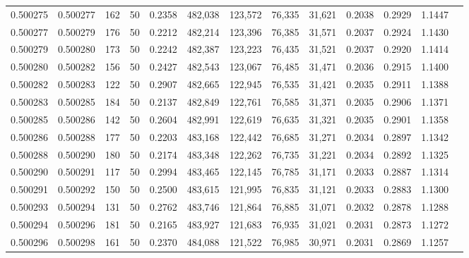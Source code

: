 \begin{tabular}{rrrrrrrrrrrrr}
0.500275 & 0.500277 & 162 &  50 &                                     0.2358 & 482,038 & 123,572 &  76,335 &  31,621 & 0.2038 & 0.2929 & 1.1447 \\
0.500277 & 0.500279 & 176 &  50 &                                     0.2212 & 482,214 & 123,396 &  76,385 &  31,571 & 0.2037 & 0.2924 & 1.1430 \\
0.500279 & 0.500280 & 173 &  50 &                                     0.2242 & 482,387 & 123,223 &  76,435 &  31,521 & 0.2037 & 0.2920 & 1.1414 \\
0.500280 & 0.500282 & 156 &  50 &                                     0.2427 & 482,543 & 123,067 &  76,485 &  31,471 & 0.2036 & 0.2915 & 1.1400 \\
0.500282 & 0.500283 & 122 &  50 &                                     0.2907 & 482,665 & 122,945 &  76,535 &  31,421 & 0.2035 & 0.2911 & 1.1388 \\
0.500283 & 0.500285 & 184 &  50 &                                     0.2137 & 482,849 & 122,761 &  76,585 &  31,371 & 0.2035 & 0.2906 & 1.1371 \\
0.500285 & 0.500286 & 142 &  50 &                                     0.2604 & 482,991 & 122,619 &  76,635 &  31,321 & 0.2035 & 0.2901 & 1.1358 \\
0.500286 & 0.500288 & 177 &  50 &                                     0.2203 & 483,168 & 122,442 &  76,685 &  31,271 & 0.2034 & 0.2897 & 1.1342 \\
0.500288 & 0.500290 & 180 &  50 &                                     0.2174 & 483,348 & 122,262 &  76,735 &  31,221 & 0.2034 & 0.2892 & 1.1325 \\
0.500290 & 0.500291 & 117 &  50 &                                     0.2994 & 483,465 & 122,145 &  76,785 &  31,171 & 0.2033 & 0.2887 & 1.1314 \\
0.500291 & 0.500292 & 150 &  50 &                                     0.2500 & 483,615 & 121,995 &  76,835 &  31,121 & 0.2033 & 0.2883 & 1.1300 \\
0.500293 & 0.500294 & 131 &  50 &                                     0.2762 & 483,746 & 121,864 &  76,885 &  31,071 & 0.2032 & 0.2878 & 1.1288 \\
0.500294 & 0.500296 & 181 &  50 &                                     0.2165 & 483,927 & 121,683 &  76,935 &  31,021 & 0.2031 & 0.2873 & 1.1272 \\
0.500296 & 0.500298 & 161 &  50 &                                     0.2370 & 484,088 & 121,522 &  76,985 &  30,971 & 0.2031 & 0.2869 & 1.1257 \\

\end{tabular}
